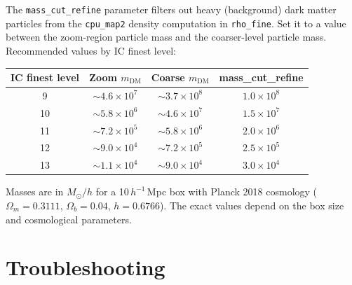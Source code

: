 \documentclass[11pt,fleqn]{book}
\begin{document}
The \texttt{mass\_cut\_refine} parameter filters out heavy (background) dark matter particles from the \texttt{cpu\_map2} density computation in \texttt{rho\_fine}. Set it to a value between the zoom-region particle mass and the coarser-level particle mass. Recommended values by IC finest level:

\begin{center}
\begin{tabular}{cccc}
\toprule
\textbf{IC finest level} & \textbf{Zoom $m_{\text{DM}}$} & \textbf{Coarse $m_{\text{DM}}$} & \textbf{mass\_cut\_refine} \\
\midrule
9 & $\sim 4.6 \times 10^7$ & $\sim 3.7 \times 10^8$ & $1.0 \times 10^8$ \\
10 & $\sim 5.8 \times 10^6$ & $\sim 4.6 \times 10^7$ & $1.5 \times 10^7$ \\
11 & $\sim 7.2 \times 10^5$ & $\sim 5.8 \times 10^6$ & $2.0 \times 10^6$ \\
12 & $\sim 9.0 \times 10^4$ & $\sim 7.2 \times 10^5$ & $2.5 \times 10^5$ \\
13 & $\sim 1.1 \times 10^4$ & $\sim 9.0 \times 10^4$ & $3.0 \times 10^4$ \\
\bottomrule
\end{tabular}
\end{center}

\begin{infobox}[Units]
Masses are in $M_\odot/h$ for a 10\,$h^{-1}$\,Mpc box with Planck 2018 cosmology ($\Omega_m=0.3111$, $\Omega_b=0.04$, $h=0.6766$). The exact values depend on the box size and cosmological parameters.
\end{infobox}

\section{Troubleshooting}
\end{document}
